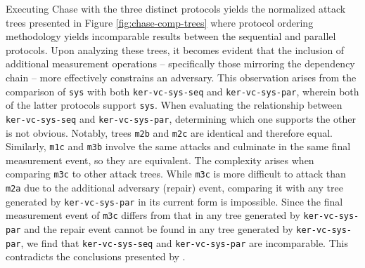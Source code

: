 \documentclass[runningheads]{llncs}
\theoremstyle{definition}
\begin{document}

Executing Chase with the three distinct protocols yields the normalized attack trees presented in Figure \ref{fig:chase-comp-trees} where protocol ordering methodology yields incomparable results between the sequential and parallel protocols. Upon analyzing these trees, it becomes evident that the inclusion of additional measurement operations -- specifically those mirroring the dependency chain -- more effectively constrains an adversary. This observation arises from the comparison of \texttt{sys} with both \texttt{ker-vc-sys-seq} and \texttt{ker-vc-sys-par}, wherein both of the latter protocols support \texttt{sys}. When evaluating the relationship between \texttt{ker-vc-sys-seq} and \texttt{ker-vc-sys-par}, determining which one supports the other is not obvious. Notably, trees \texttt{m2b} and \texttt{m2c} are identical and therefore equal. Similarly, \texttt{m1c} and \texttt{m3b} involve the same attacks and culminate in the same final measurement event, so they are equivalent. The complexity arises when comparing \texttt{m3c} to other attack trees. While \texttt{m3c} is more difficult to attack than \texttt{m2a} due to the additional adversary (repair) event, comparing it with any tree generated by \texttt{ker-vc-sys-par} in its current form is impossible. Since the final measurement event of \texttt{m3c} differs from that in any tree generated by \texttt{ker-vc-sys-par} and the repair event cannot be found in any tree generated by \texttt{ker-vc-sys-par}, we find that \texttt{ker-vc-sys-seq} and \texttt{ker-vc-sys-par} are incomparable. This contradicts the conclusions presented by \citet{Rowe:2021:AutomatedTrust}. 
\end{document}
